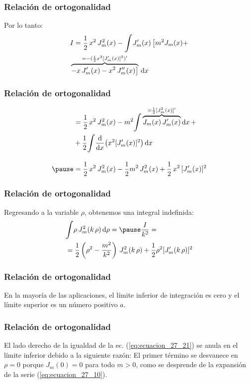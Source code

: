 \documentclass[12pt]{beamer}
\begin{document}
\begin{frame}
\frametitle{Relación de ortogonalidad}
Por lo tanto:
\begin{eqnarray*}
\begin{aligned}
&I = \dfrac{1}{2} \, x^{2} \, J_{m}^{2} (x) - \scaleint{6ex} J_{m}^{\prime}(x) \, \big[ m^{2} J_{m}(x) + \\
&{}\overbrace{- x \, J_{m}^{\prime} (x) - x^{2} \, J_{m}^{\prime \prime} (x) \big ]}^{=-(\frac{1}{2} x^{2} [J_{m}^{\prime} (x)]^{2})^{\prime}} \, \dd{x} 
\end{aligned}
\end{eqnarray*}
\end{frame}
\begin{frame}
\frametitle{Relación de ortogonalidad}
\begin{eqnarray*}
\begin{aligned}
&= \dfrac{1}{2} \, x^{2} \, J_{m}^{2} (x) - m^{2} \scaleint{6ex} \overbrace{J_{m} (x) \, J_{m}^{\prime} (x)}^{=\frac{1}{2} [J_{m}^{2}(x)]^{\prime}} \dd{x} + \\ 
&+ \dfrac{1}{2} \scaleint{6ex} \dv{x} (x^{2} [J_{m}^{\prime} (x)]^{2}) \dd{x} \\[1em] \pause 
&= \dfrac{1}{2} \, x^{2} \, J_{m}^{2} (x) - \dfrac{1}{2} m^{2} \, J_{m}^{2} (x) + \dfrac{1}{2} \, x^{2} \, [J_{m}^{\prime}(x)]^{2}
\end{aligned}
\end{eqnarray*}
\end{frame}
\begin{frame}
\frametitle{Relación de ortogonalidad}
Regresando a la variable $\rho$, obtenemos una integral indefinida:
\pause
\begin{eqnarray}
\begin{aligned}[b]
&\scaleint{6ex} \rho \, J_{m}^{2} ( k \, \rho) \dd{\rho} = \pause \dfrac{I}{k^{2}} = \\
&= \dfrac{1}{2} \left(\rho^{2} - \dfrac{m^{2}}{k^{2}} \right) \, J_{m}^{2} (k \, \rho) + \dfrac{1}{2} \rho^{2} [J_{m}^{\prime}(k \, \rho)]^{2}
\end{aligned}
\label{eq:ecuacion_27_21}
\end{eqnarray}
\end{frame}
\begin{frame}
\frametitle{Relación de ortogonalidad}
En la mayoría de las aplicaciones, el límite inferior de integración es cero y el límite superior es un número positivo $a$. 
\end{frame}
\begin{frame}
\frametitle{Relación de ortogonalidad}
El lado derecho de la igualdad de la ec. (\ref{eq:ecuacion_27_21}) se anula en el límite inferior debido a la siguiente razón: \pause El primer término se desvanece en $\rho = 0$ porque $J_{m} (0) = 0$ para todo $m > 0$, como se desprende de la expansión de la serie (\ref{eq:ecuacion_27_10}). 
\end{frame}
\end{document}
